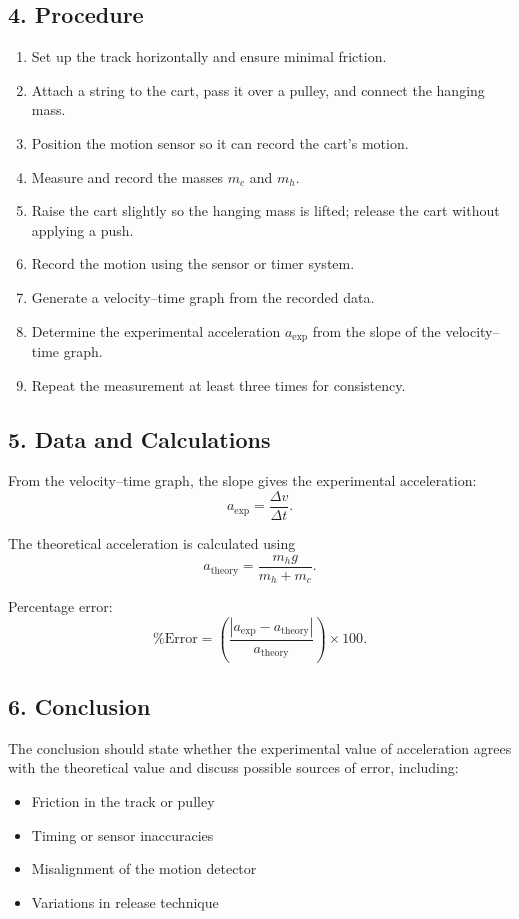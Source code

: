 \subsection*{4. Procedure}
\begin{enumerate}
    \item Set up the track horizontally and ensure minimal friction.
    \item Attach a string to the cart, pass it over a pulley, and connect the hanging mass.
    \item Position the motion sensor so it can record the cart's motion.
    \item Measure and record the masses \(m_c\) and \(m_h\).
    \item Raise the cart slightly so the hanging mass is lifted; release the cart without applying a push.
    \item Record the motion using the sensor or timer system.
    \item Generate a velocity--time graph from the recorded data.
    \item Determine the experimental acceleration \(a_{\text{exp}}\) from the slope of the velocity--time graph.
    \item Repeat the measurement at least three times for consistency.
\end{enumerate}

\subsection*{5. Data and Calculations}
From the velocity--time graph, the slope gives the experimental acceleration:
\[
a_{\text{exp}} = \frac{\Delta v}{\Delta t}.
\]

The theoretical acceleration is calculated using
\[
a_{\text{theory}} = \frac{m_h g}{m_h + m_c}.
\]

Percentage error:
\[
\% \text{Error} = 
\left(
\frac{|a_{\text{exp}} - a_{\text{theory}}|}{a_{\text{theory}}}
\right) \times 100.
\]

\subsection*{6. Conclusion}
The conclusion should state whether the experimental value of acceleration agrees with the theoretical value and discuss possible sources of error, including:
\begin{itemize}
    \item Friction in the track or pulley
    \item Timing or sensor inaccuracies
    \item Misalignment of the motion detector
    \item Variations in release technique
\end{itemize}

